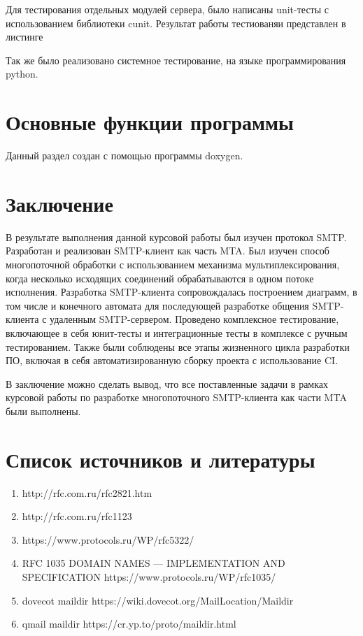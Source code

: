 \documentclass[a4paper,12pt]{report}
\begin{document}
	Для тестирования отдельных модулей сервера, было написаны unit-тесты с использованием библиотеки cunit. Результат работы тестиованяи представлен в листинге 
		
	Так же было реализовано системное тестирование, на языке программирования python.

	\section{Основные функции программы}

	Данный раздел  создан с помощью программы doxygen.

	
	
	   
	
	
	
		

	\section{Заключение}
	
	В результате выполнения данной курсовой работы был изучен протокол SMTP. Разработан и реализован SMTP-клиент как часть MTA. Был изучен способ многопоточной обработки с использованием механизма мультиплексирования, когда несколько исходящих соединений обрабатываются в одном потоке исполнения. Разработка SMTP-клиента сопровождалась построением диаграмм, в том числе и конечного автомата для последующей разработке общения SMTP-клиента с удаленным SMTP-сервером. Проведено комплексное тестирование, включающее в себя юнит-тесты и интеграционные тесты в комплексе с ручным тестированием. Также были соблюдены все этапы жизненного цикла разработки ПО, включая в себя автоматизированную сборку проекта с использование CI.
	
	В заключение можно сделать вывод, что все поставленные задачи в рамках курсовой работы по разработке многопоточного SMTP-клиента как части MTA были выполнены.

	\section{Список источников и литературы}
	\begin{enumerate}
		\item http://rfc.com.ru/rfc2821.htm
		\item http://rfc.com.ru/rfc1123
		\item https://www.protocols.ru/WP/rfc5322/
		\item RFC 1035 DOMAIN NAMES — IMPLEMENTATION AND SPECIFICATION  https://www.protocols.ru/WP/rfc1035/
		\item dovecot maildir https://wiki.dovecot.org/MailLocation/Maildir
		\item qmail maildir https://cr.yp.to/proto/maildir.html
	\end{enumerate}
	
	\newpage	
\end{document}
